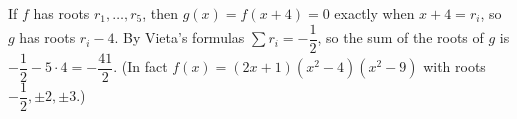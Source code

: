 If $f$ has roots $r_1,\dots,r_5$, then $g(x)=f(x+4)=0$ exactly when $x+4=r_i$, so $g$ has roots $r_i-4$. By Vieta's formulas $\sum r_i=-\dfrac{1}{2}$, so the sum of the roots of $g$ is $-\dfrac{1}{2}-5\cdot4=\boxed{-\dfrac{41}{2}}$. (In fact $f(x)=(2x+1)(x^2-4)(x^2-9)$ with roots $-\dfrac{1}{2},\pm2,\pm3$.)
